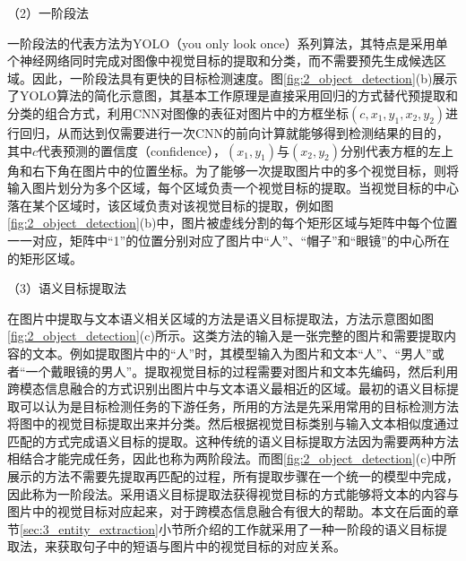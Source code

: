 {\sffamily （2）一阶段法}

一阶段法的代表方法为YOLO（you only look once）系列算法，其特点是采用单个神经网络同时完成对图像中视觉目标的提取和分类，而不需要预先生成候选区域。因此，一阶段法具有更快的目标检测速度。图\ref{fig:2_object_detection}(b)展示了YOLO算法的简化示意图，其基本工作原理是直接采用回归的方式替代预提取和分类的组合方式，利用CNN对图像的表征对图片中的方框坐标$(c,x_1,y_1,x_2,y_2)$进行回归，从而达到仅需要进行一次CNN的前向计算就能够得到检测结果的目的，其中$c$代表预测的置信度（confidence），$(x_1,y_1)$与$(x_2,y_2)$分别代表方框的左上角和右下角在图片中的位置坐标。为了能够一次提取图片中的多个视觉目标，则将输入图片划分为多个区域，每个区域负责一个视觉目标的提取。当视觉目标的中心落在某个区域时，该区域负责对该视觉目标的提取，例如图\ref{fig:2_object_detection}(b)中，图片被虚线分割的每个矩形区域与矩阵中每个位置一一对应，矩阵中“1”的位置分别对应了图片中“人”、“帽子”和“眼镜”的中心所在的矩形区域。

{\sffamily （3）语义目标提取法}

在图片中提取与文本语义相关区域的方法是语义目标提取法，方法示意图如图\ref{fig:2_object_detection}(c)所示。这类方法的输入是一张完整的图片和需要提取内容的文本。例如提取图片中的“人”时，其模型输入为图片和文本“人”、“男人”或者“一个戴眼镜的男人”。提取视觉目标的过程需要对图片和文本先编码，然后利用跨模态信息融合的方式识别出图片中与文本语义最相近的区域。最初的语义目标提取可以认为是目标检测任务的下游任务，所用的方法是先采用常用的目标检测方法将图中的视觉目标提取出来并分类。然后根据视觉目标类别与输入文本相似度通过匹配的方式完成语义目标的提取。这种传统的语义目标提取方法因为需要两种方法相结合才能完成任务，因此也称为两阶段法。而图\ref{fig:2_object_detection}(c)中所展示的方法不需要先提取再匹配的过程，所有提取步骤在一个统一的模型中完成，因此称为一阶段法。采用语义目标提取法获得视觉目标的方式能够将文本的内容与图片中的视觉目标对应起来，对于跨模态信息融合有很大的帮助。本文在后面的章节\ref{sec:3_entity_extraction}小节所介绍的工作就采用了一种一阶段的语义目标提取法，来获取句子中的短语与图片中的视觉目标的对应关系。






